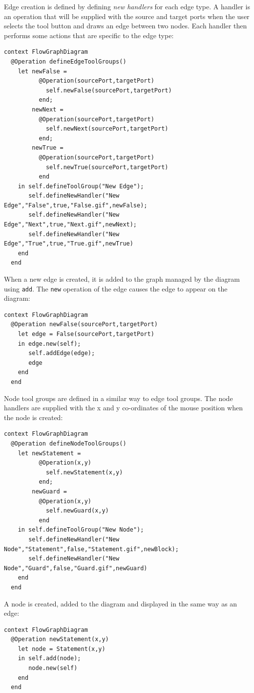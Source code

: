 \documentclass{article}
\begin{document}
Edge creation is defined by defining {\em new handlers} for each edge type. A handler is
an operation that will be supplied with the source and target ports when the user selects
the tool button and draws an edge between two nodes. Each handler then performs some 
actions that are specific to the edge type:
\begin{verbatim}
context FlowGraphDiagram
  @Operation defineEdgeToolGroups()
    let newFalse = 
          @Operation(sourcePort,targetPort) 
            self.newFalse(sourcePort,targetPort) 
          end;
        newNext = 
          @Operation(sourcePort,targetPort) 
            self.newNext(sourcePort,targetPort) 
          end;
        newTrue = 
          @Operation(sourcePort,targetPort) 
            self.newTrue(sourcePort,targetPort) 
          end
    in self.defineToolGroup("New Edge");
       self.defineNewHandler("New Edge","False",true,"False.gif",newFalse);
       self.defineNewHandler("New Edge","Next",true,"Next.gif",newNext);
       self.defineNewHandler("New Edge","True",true,"True.gif",newTrue)
    end 
  end
\end{verbatim}
When a new edge is created, it is added to the graph managed by the diagram using {\tt add}.
The {\tt new} operation of the edge causes the edge to appear on the diagram:
\begin{verbatim}
context FlowGraphDiagram
  @Operation newFalse(sourcePort,targetPort)
    let edge = False(sourcePort,targetPort)
    in edge.new(self);
       self.addEdge(edge);
       edge
    end
  end
\end{verbatim}
Node tool groups are defined in a similar way to edge tool groups. The node handlers are
supplied with the x and y co-ordinates of the mouse position when the node is created:
\begin{verbatim}
context FlowGraphDiagram   
  @Operation defineNodeToolGroups()
    let newStatement = 
          @Operation(x,y)
            self.newStatement(x,y)
          end;
        newGuard = 
          @Operation(x,y)
            self.newGuard(x,y)
          end
    in self.defineToolGroup("New Node");
       self.defineNewHandler("New Node","Statement",false,"Statement.gif",newBlock);
       self.defineNewHandler("New Node","Guard",false,"Guard.gif",newGuard)
    end
  end
\end{verbatim}
A node is created, added to the diagram and displayed in the same way as an edge:
\begin{verbatim}
context FlowGraphDiagram
  @Operation newStatement(x,y)
    let node = Statement(x,y)
    in self.add(node);
       node.new(self)
    end
  end
\end{verbatim}
\end{document}
